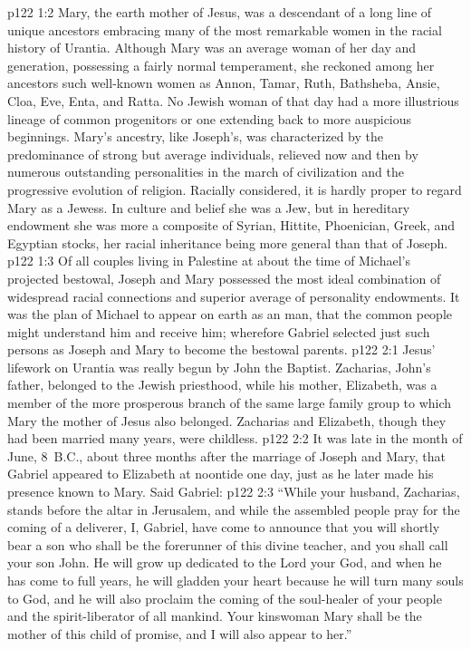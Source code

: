 \vs p122 1:2 Mary, the earth mother of Jesus, was a descendant of a long line of unique ancestors embracing many of the most remarkable women in the racial history of Urantia. Although Mary was an average woman of her day and generation, possessing a fairly normal temperament, she reckoned among her ancestors such well\hyp{}known women as Annon, Tamar, Ruth, Bathsheba, Ansie, Cloa, Eve, Enta, and Ratta. No Jewish woman of that day had a more illustrious lineage of common progenitors or one extending back to more auspicious beginnings. Mary’s ancestry, like Joseph’s, was characterized by the predominance of strong but average individuals, relieved now and then by numerous outstanding personalities in the march of civilization and the progressive evolution of religion. Racially considered, it is hardly proper to regard Mary as a Jewess. In culture and belief she was a Jew, but in hereditary endowment she was more a composite of Syrian, Hittite, Phoenician, Greek, and Egyptian stocks, her racial inheritance being more general than that of Joseph.
\vs p122 1:3 Of all couples living in Palestine at about the time of Michael’s projected bestowal, Joseph and Mary possessed the most ideal combination of widespread racial connections and superior average of personality endowments. It was the plan of Michael to appear on earth as an  man, that the common people might understand him and receive him; wherefore Gabriel selected just such persons as Joseph and Mary to become the bestowal parents.\plusone
{}
\vs p122 2:1 Jesus’ lifework on Urantia was really begun by John the Baptist. Zacharias, John’s father, belonged to the Jewish priesthood, while his mother, Elizabeth, was a member of the more prosperous branch of the same large family group to which Mary the mother of Jesus also belonged. Zacharias and Elizabeth, though they had been married many years, were childless.
\pc \vs p122 2:2 It was late in the month of June, 8~B.C., about three months after the marriage of Joseph and Mary, that Gabriel appeared to Elizabeth at noontide one day, just as he later made his presence known to Mary. Said Gabriel:
\vs p122 2:3 “While your husband, Zacharias, stands before the altar in Jerusalem, and while the assembled people pray for the coming of a deliverer, I, Gabriel, have come to announce that you will shortly bear a son who shall be the forerunner of this divine teacher, and you shall call your son John. He will grow up dedicated to the Lord your God, and when he has come to full years, he will gladden your heart because he will turn many souls to God, and he will also proclaim the coming of the soul\hyp{}healer of your people and the spirit\hyp{}liberator of all mankind. Your kinswoman Mary shall be the mother of this child of promise, and I will also appear to her.”
